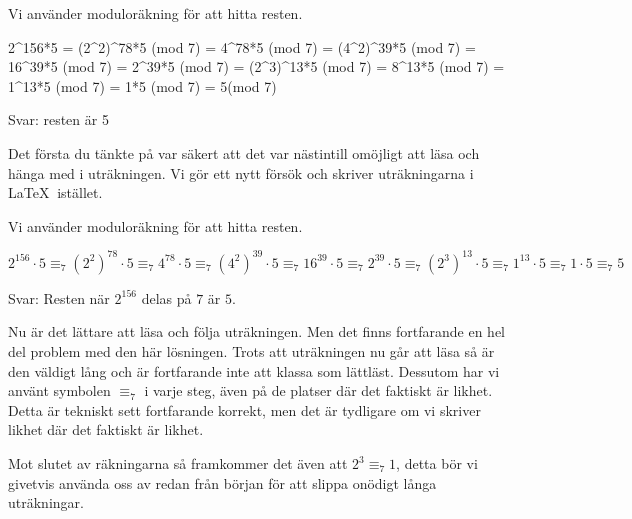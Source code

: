\documentclass[titlepage]{article}
\begin{document}
\begin{center}
\begin{tcolorbox}[width=\linewidth,colback={red!15!white},title={\textbf{Lösning 1 - Sämre}},outer arc=0mm,colupper=black]
    Vi använder moduloräkning för att hitta resten.

    2\textasciicircum{156}*5 = (2\textasciicircum2)\textasciicircum 78*5 (mod 7) = 4\textasciicircum78*5 (mod 7) = (4\textasciicircum2)\textasciicircum39*5 (mod 7) = 16\textasciicircum39*5 (mod 7) = 2\textasciicircum39*5 (mod 7) = (2\textasciicircum3)\textasciicircum13*5 (mod 7) = 8\textasciicircum13*5 (mod 7) = 1\textasciicircum13*5 (mod 7) = 1*5 (mod 7) = 5(mod 7)

    Svar: resten är 5
\end{tcolorbox} 
\end{center}

Det första du tänkte på var säkert att det var nästintill omöjligt att läsa och hänga med i uträkningen. Vi gör ett nytt försök och skriver uträkningarna i \LaTeX$\:$ istället.

\begin{center}
\begin{tcolorbox}[width=\linewidth,colback={red!15!white},title={\textbf{Lösning 2 - Något bättre}},outer arc=0mm,colupper=black]
    Vi använder moduloräkning för att hitta resten.

    $2^{156}\cdot 5 \equiv_7 (2^2)^{78}\cdot 5\equiv_7 4^{78} \cdot 5 \equiv_7 (4^2)^{39} \cdot 5 \equiv_7 16^{39} \cdot 5 \equiv_7 2^{39} \cdot 5 \equiv_7 (2^3)^{13} \cdot 5 \equiv_7 1^{13}\cdot 5 \equiv_7 1 \cdot 5 \equiv_7 5$

    Svar: Resten när $2^{156}$ delas på $7$ är $5$.
\end{tcolorbox} 
\end{center}

Nu är det lättare att läsa och följa uträkningen. Men det finns fortfarande en hel del problem med den här lösningen. Trots att uträkningen nu går att läsa så är den väldigt lång och är fortfarande inte att klassa som lättläst. Dessutom har vi använt symbolen $\equiv_7$ i varje steg, även på de platser där det faktiskt är likhet. Detta är tekniskt sett fortfarande korrekt, men det är tydligare om vi skriver likhet där det faktiskt är likhet. 

Mot slutet av räkningarna så framkommer det även att $2^3 \equiv_7 1$, detta bör vi givetvis använda oss av redan från början för att slippa onödigt långa uträkningar.
\end{document}

